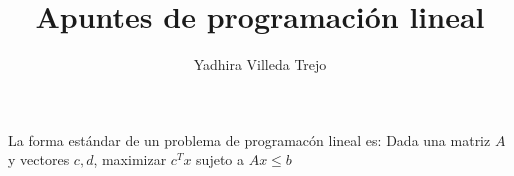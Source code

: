\documentclass{article}
\title{Apuntes de programaci\'on lineal}
\author{Yadhira Villeda Trejo}
\begin{document}
\maketitle
La forma estándar de un problema de programacón lineal es:
Dada una matriz $A$ y vectores $c,d$, maximizar $c^Tx$ sujeto a  $Ax\leq b$
\end{document}
